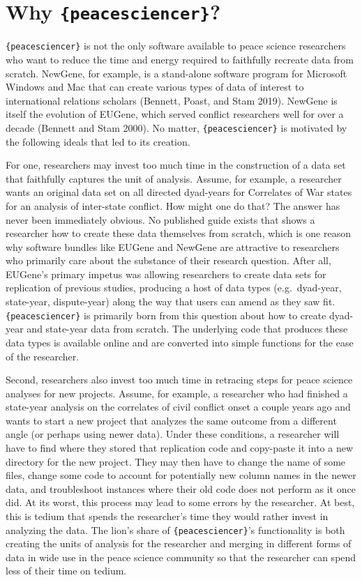 \documentclass[
  11pt,
]{article}
\begin{document}
\hypertarget{why-peacesciencer}{%
\section{\texorpdfstring{Why \texttt{\{peacesciencer\}}?}{Why \{peacesciencer\}?}}\label{why-peacesciencer}}

\texttt{\{peacesciencer\}} is not the only software available to peace science researchers who want to reduce the time and energy required to faithfully recreate data from scratch. NewGene, for example, is a stand-alone software program for Microsoft Windows and Mac that can create various types of data of interest to international relations scholars (Bennett, Poast, and Stam 2019). NewGene is itself the evolution of EUGene, which served conflict researchers well for over a decade (Bennett and Stam 2000). No matter, \texttt{\{peacesciencer\}} is motivated by the following ideals that led to its creation.

For one, researchers may invest too much time in the construction of a data set that faithfully captures the unit of analysis. Assume, for example, a researcher wants an original data set on all directed dyad-years for Correlates of War states for an analysis of inter-state conflict. How might one do that? The answer has never been immediately obvious. No published guide exists that shows a researcher how to create these data themselves from scratch, which is one reason why software bundles like EUGene and NewGene are attractive to researchers who primarily care about the substance of their research question. After all, EUGene's primary impetus was allowing researchers to create data sets for replication of previous studies, producing a host of data types (e.g.~dyad-year, state-year, dispute-year) along the way that users can amend as they saw fit. \texttt{\{peacesciencer\}} is primarily born from this question about how to create dyad-year and state-year data from scratch. The underlying code that produces these data types is available online and are converted into simple functions for the ease of the researcher.

Second, researchers also invest too much time in retracing steps for peace science analyses for new projects. Assume, for example, a researcher who had finished a state-year analysis on the correlates of civil conflict onset a couple years ago and wants to start a new project that analyzes the same outcome from a different angle (or perhaps using newer data). Under these conditions, a researcher will have to find where they stored that replication code and copy-paste it into a new directory for the new project. They may then have to change the name of some files, change some code to account for potentially new column names in the newer data, and troubleshoot instances where their old code does not perform as it once did. At its worst, this process may lead to some errors by the researcher. At best, this is tedium that spends the researcher's time they would rather invest in analyzing the data. The lion's share of \texttt{\{peacesciencer\}}'s functionality is both creating the units of analysis for the researcher and merging in different forms of data in wide use in the peace science community so that the researcher can spend less of their time on tedium.
\end{document}
